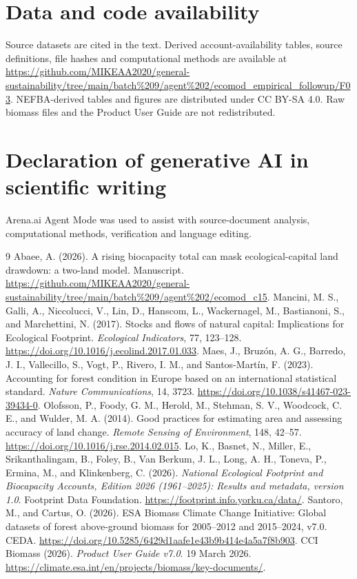 \documentclass[11pt,a4paper]{article}
\begin{document}
\section*{Data and code availability}
Source datasets are cited in the text. Derived account-availability tables, source definitions, file hashes and computational methods are available at \url{https://github.com/MIKEAA2020/general-sustainability/tree/main/batch%209/agent%202/ecomod_empirical_followup/F03}. NEFBA-derived tables and figures are distributed under CC BY-SA 4.0. Raw biomass files and the Product User Guide are not redistributed.

\section*{Declaration of generative AI in scientific writing}
Arena.ai Agent Mode was used to assist with source-document analysis, computational methods, verification and language editing.

\begin{thebibliography}{9}
 Abaee, A. (2026). A rising biocapacity total can mask ecological-capital land drawdown: a two-land model. Manuscript. \url{https://github.com/MIKEAA2020/general-sustainability/tree/main/batch%209/agent%202/ecomod_c15}.
 Mancini, M. S., Galli, A., Niccolucci, V., Lin, D., Hanscom, L., Wackernagel, M., Bastianoni, S., and Marchettini, N. (2017). Stocks and flows of natural capital: Implications for Ecological Footprint. \emph{Ecological Indicators}, 77, 123--128. \url{https://doi.org/10.1016/j.ecolind.2017.01.033}.
 Maes, J., Bruz\'on, A. G., Barredo, J. I., Vallecillo, S., Vogt, P., Rivero, I. M., and Santos-Mart\'in, F. (2023). Accounting for forest condition in Europe based on an international statistical standard. \emph{Nature Communications}, 14, 3723. \url{https://doi.org/10.1038/s41467-023-39434-0}.
 Olofsson, P., Foody, G. M., Herold, M., Stehman, S. V., Woodcock, C. E., and Wulder, M. A. (2014). Good practices for estimating area and assessing accuracy of land change. \emph{Remote Sensing of Environment}, 148, 42--57. \url{https://doi.org/10.1016/j.rse.2014.02.015}.
 Lo, K., Basnet, N., Miller, E., Srikanthalingam, B., Foley, B., Van Berkum, J. L., Long, A. H., Toneva, P., Ermina, M., and Klinkenberg, C. (2026). \emph{National Ecological Footprint and Biocapacity Accounts, Edition 2026 (1961--2025): Results and metadata, version 1.0}. Footprint Data Foundation. \url{https://footprint.info.yorku.ca/data/}.
 Santoro, M., and Cartus, O. (2026). ESA Biomass Climate Change Initiative: Global datasets of forest above-ground biomass for 2005--2012 and 2015--2024, v7.0. CEDA. \url{https://doi.org/10.5285/6429d1aafe1e43b9b414e4a5a7f8b903}.
 CCI Biomass (2026). \emph{Product User Guide v7.0}. 19 March 2026. \url{https://climate.esa.int/en/projects/biomass/key-documents/}.
\end{thebibliography}
\end{document}
